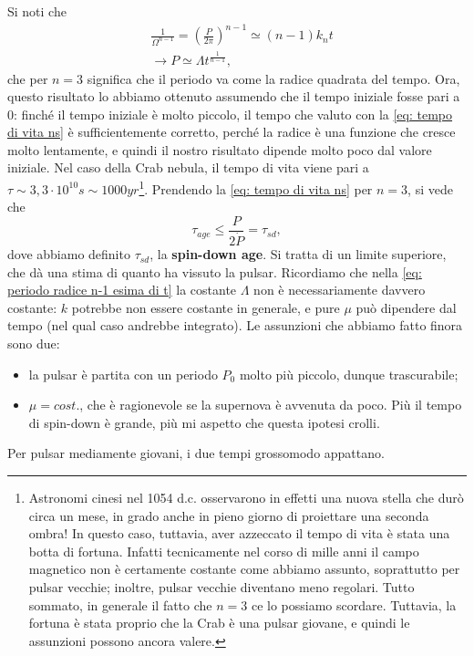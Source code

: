 Si noti che
\begin{align}
    &\frac{1}{\Omega^{n-1}}= \left(\frac{P}{2\pi}\right)^{n-1} \simeq (n-1)k_nt \\
    &\xrightarrow{} P\simeq\Lambda t^{\frac{1}{n-1}},
    \label{eq: periodo radice n-1 esima di t}
\end{align}
che per $n=3$ significa che il periodo va come la radice quadrata del tempo.
Ora, questo risultato lo abbiamo ottenuto assumendo che il tempo iniziale fosse pari a $0$: finché il tempo iniziale è molto piccolo, il tempo che valuto con la \eqref{eq: tempo di vita ns} è sufficientemente corretto, perché la radice è una funzione che cresce molto lentamente, e quindi il nostro risultato dipende molto poco dal valore iniziale.
Nel caso della Crab nebula, il tempo di vita viene pari a $\tau\sim3,3\cdot10^{10}s \sim 1000yr$\footnote{Astronomi cinesi nel 1054 d.c. osservarono in effetti una nuova stella che durò circa un mese, in grado anche in pieno giorno di proiettare una seconda ombra!
In questo caso, tuttavia, aver azzeccato il tempo di vita è stata una botta di fortuna. 
Infatti tecnicamente nel corso di mille anni il campo magnetico non è certamente costante  come abbiamo assunto, soprattutto per pulsar vecchie; inoltre, pulsar vecchie diventano meno regolari. 
Tutto sommato, in generale il fatto che $n=3$ ce lo possiamo scordare.
Tuttavia, la fortuna è stata proprio che la Crab è una pulsar giovane, e quindi le assunzioni possono ancora valere.}. 
Prendendo la \eqref{eq: tempo di vita ns} per $n=3$, si vede che 
\begin{equation}
    \tau_{age}\leq \frac{P}{2\dot{P}} = \tau_{sd},
\end{equation}
dove abbiamo definito $\tau_{sd}$, la \textbf{spin-down age}.
Si tratta di un limite superiore, che dà una stima di quanto ha vissuto la pulsar.
Ricordiamo che nella \eqref{eq: periodo radice n-1 esima di t} la costante $\Lambda$ non è necessariamente davvero costante: $k$ potrebbe non essere costante in generale, e pure $\mu$ può dipendere dal tempo (nel qual caso andrebbe integrato).
Le assunzioni che abbiamo fatto finora sono due:
\begin{itemize}
    \item la pulsar è partita con un periodo $P_0$ molto più piccolo, dunque trascurabile;
    \item $\mu=cost.$, che è ragionevole se la supernova è avvenuta da poco. Più il tempo di spin-down è grande, più mi aspetto che questa ipotesi crolli.
\end{itemize}
Per pulsar mediamente giovani, i due tempi grossomodo appattano.


